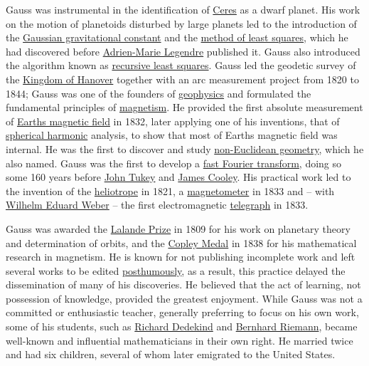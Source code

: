Gauss was instrumental in the identification of \href{https://en.wikipedia.org/wiki/Ceres_(dwarf_planet)}{Ceres} as a dwarf planet. His work on the motion of planetoids disturbed by large planets led to the introduction of the \href{https://en.wikipedia.org/wiki/Gaussian_gravitational_constant}{Gaussian gravitational constant} and the \href{https://en.wikipedia.org/wiki/Least_squares}{method of least squares}, which he had discovered before \href{https://en.wikipedia.org/wiki/Adrien-Marie_Legendre}{Adrien-Marie Legendre} published it. Gauss also introduced the algorithm known as \href{https://en.wikipedia.org/wiki/Recursive_least_squares_filter}{recursive least squares}. Gauss led the geodetic survey of the \href{https://en.wikipedia.org/wiki/Kingdom_of_Hanover}{Kingdom of Hanover} together with an arc measurement project from 1820 to 1844; Gauss was one of the founders of \href{https://en.wikipedia.org/wiki/Geophysics}{geophysics} and formulated the fundamental principles of \href{https://en.wikipedia.org/wiki/Magnetism}{magnetism}. He provided the first absolute measurement of \href{https://en.wikipedia.org/wiki/Earth's_magnetic_field}{Earth\textquotesingle s magnetic field} in 1832, later applying one of his inventions, that of \href{https://en.wikipedia.org/wiki/Spherical_harmonics}{spherical harmonic} analysis, to show that most of Earth\textquotesingle s magnetic field was internal. He was the first to discover and study \href{https://en.wikipedia.org/wiki/Non-Euclidean_geometry}{non-Euclidean geometry}, which he also named. Gauss was the first to develop a \href{https://en.wikipedia.org/wiki/Fast_Fourier_transform}{fast Fourier transform}, doing so some 160 years before \href{https://en.wikipedia.org/wiki/John_Tukey}{John Tukey} and \href{https://en.wikipedia.org/wiki/James_Cooley}{James Cooley}. His practical work led to the invention of the \href{https://en.wikipedia.org/wiki/Heliotrope_(instrument)}{heliotrope} in 1821, a \href{https://en.wikipedia.org/wiki/Magnetometer}{magnetometer} in 1833 and -- with \href{https://en.wikipedia.org/wiki/Wilhelm_Eduard_Weber}{Wilhelm Eduard Weber} -- the first electromagnetic \href{https://en.wikipedia.org/wiki/Telegraphy}{telegraph} in 1833.

Gauss was awarded the \href{https://en.wikipedia.org/wiki/Lalande_Prize}{Lalande Prize} in 1809 for his work on planetary theory and determination of orbits, and the \href{https://en.wikipedia.org/wiki/Copley_Medal}{Copley Medal} in 1838 for his mathematical research in magnetism. He is known for not publishing incomplete work and left several works to be edited \href{https://en.wikipedia.org/wiki/Posthumous_publication}{posthumously}, as a result, this practice delayed the dissemination of many of his discoveries. He believed that the act of learning, not possession of knowledge, provided the greatest enjoyment. While Gauss was not a committed or enthusiastic teacher, generally preferring to focus on his own work, some of his students, such as \href{https://en.wikipedia.org/wiki/Richard_Dedekind}{Richard Dedekind} and \href{https://en.wikipedia.org/wiki/Bernhard_Riemann}{Bernhard Riemann}, became well-known and influential mathematicians in their own right. He married twice and had six children, several of whom later emigrated to the United States.


